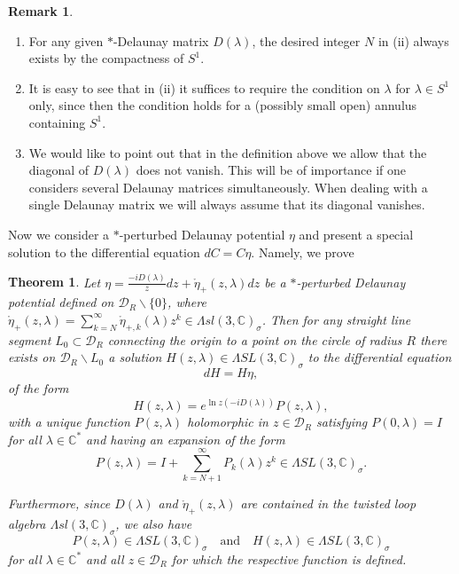 \documentclass[a4paper,11pt]{amsart}
\newtheorem{theorem}{Theorem}[section]
\theoremstyle{definition}
\newtheorem{remark}{Remark}
\numberwithin{equation}{section}
\begin{document}
\begin{remark}
\begin{enumerate}
\item For any given $*$-Delaunay matrix $D(\lambda)$,  the desired integer $N$ in (ii)  always exists by 
the compactness of $S^1$.
\item It is easy to see that in  (ii) it suffices to require  the condition on $\lambda$  
for $\lambda \in S^1$ only,
since then the condition holds for a (possibly small open) annulus containing $S^1$.
\item We would like to point out that in the definition above we
allow that the diagonal of $D(\lambda)$ 
does not vanish. This will be of importance if one considers several Delaunay matrices simultaneously.
When dealing with a single Delaunay matrix we will always assume that its diagonal vanishes.
\end{enumerate}
\end{remark}

Now we consider a $*$-perturbed Delaunay potential $\eta$ and present a special solution to the differential equation 
$dC=C\eta$. Namely, we prove

\begin{theorem}\label{thm:Sch-Sch}
Let $\eta=\frac{-i D(\lambda)}{z} dz+\mathring{\eta}_{+}(z,\lambda)dz$ be a $*$-perturbed Delaunay potential 
defined on   $\mathcal{D}_R\backslash\{0\}$,  where $\mathring{\eta}_+(z,\lambda)=
\sum_{k=N}^{\infty} \mathring{\eta}_{+,k}(\lambda)  z^k \in \Lambda sl(3,\mathbb{C})_{\sigma} $.
 Then  for any straight line segment $L_0 \subset \mathcal{D}_R$ connecting the origin to 
 a point on the circle of radius $R$
 there exists on $ \mathcal{D}_R\backslash L_0$ 
 a solution $H(z,\lambda)\in \Lambda SL(3,\mathbb{C})_{\sigma}$ to the differential equation  
\begin{equation}\label{eq:H}
dH = H \eta, 
\end{equation} 
 of the form
\begin{equation}\label{eq:H solution}
 H(z, \lambda) = e^{\ln z (-iD(\lambda))} P(z,\lambda),
 \end{equation}
with a unique function $P(z,\lambda)$ holomorphic in $z\in \mathcal{D}_R$ 
satisfying $P(0,\lambda) = I$ 
for all $\lambda\in \mathbb{C}^*$ and having an expansion of the form
$$P(z, \lambda) = I + \sum_{k=N +1}^{\infty} P_k (\lambda)  z^k \in 
\Lambda SL(3,\mathbb{C})_{\sigma} . $$


Furthermore, since $D(\lambda)$ and $\mathring{\eta}_{+}(z,\lambda)$ are contained in the twisted loop algebra $\Lambda sl(3,\mathbb{C})_{\sigma}$, we also have
\begin{equation}
P(z, \lambda) \in \Lambda SL(3,\mathbb{C})_{\sigma} \quad \mbox{and}  \quad H(z,\lambda) \in \Lambda SL(3,\mathbb{C})_{\sigma}
\end{equation}
 for all  $\lambda \in \mathbb{C}^*$ and all $z \in \mathcal{D}_R$  for which the respective function is defined.
 \end{theorem}
 
\end{document}
